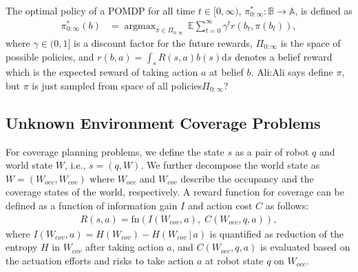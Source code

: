 \documentclass[letterpaper]{article} %
\newcommand{\phdone}[1]{} %
\newcommand{\acomm}[1]{{\color{cyan}Ali:#1}} %
\newcommand{\argmax}{\mathop{\mathrm{argmax}}}
\begin{document}
\phdone{POMDP Objective function}
The optimal policy of a POMDP for all time $t \in [0,\infty)$, $\pi_{0:\infty}^* \! : \mathbb{B} \to \mathbb{A}$, is defined as
\begin{align}
  \pi_{0:\infty}^*(b) &= \argmax_{\pi \in \Pi_{0:\infty}} \, \mathbb{E} \sum_{t=0}^{\infty} \gamma^t r(b_t, \pi(b_t)),
  \label{eq:objective_function}
\end{align}
where $\gamma \in (0, 1]$ is a discount factor for the future rewards, $\Pi_{0:\infty}$ is the space of possible policies, and $r(b,a)=\int_s R(s,a)b(s)\mathrm{d}s$ denotes a belief reward which is the expected reward of taking action $a$ at belief $b$. \acomm{Ali says define $\pi$, but $\pi$ is just sampled from space of all policies$\Pi_{0:\infty}$?}

\subsection{Unknown Environment Coverage Problems}

\phdone{Coverage Problem}
For coverage planning problems, we define the state $s$ as a pair of robot $q$ and world state $W$, i.e., $s = (q, W)$.
We further decompose the world state as $W = (W_{occ}, W_{cov})$ where $W_{occ}$ and $W_{cov}$ describe the occupancy and the coverage states of the world, respectively.
%
A reward function for coverage can be defined as a function of information gain $I$ and action cost $C$ as follows:
\begin{align}
  R(s, a) = \mathrm{fn}(I(W_{cov}, a),\; C(W_{occ}, q, a)),
  \label{eq:coverage_reward}
\end{align}
where $I(W_{cov}, a) = H(W_{cov}) - H(W_{cov} \,|\, a)$ is quantified as reduction of the entropy $H$ in $W_{cov}$ after taking action $a$,
and $C(W_{occ}, q, a)$ is evaluated based on the actuation efforts and risks to take action $a$ at robot state $q$ on $W_{occ}$.
\end{document}
